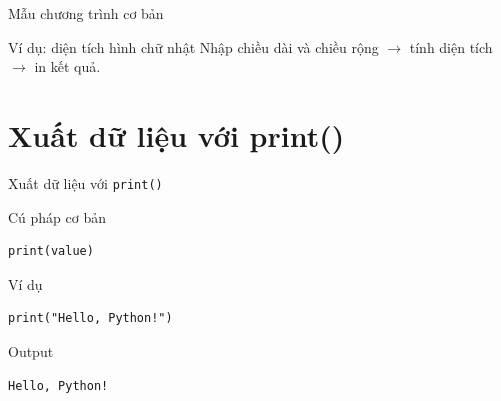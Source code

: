 \documentclass[aspectratio=169,10pt]{beamer}
\begin{document}
\begin{frame}{Mẫu chương trình cơ bản}
\begin{center}
\end{center}
\vspace{0.3cm}
\begin{block}{Ví dụ: diện tích hình chữ nhật}
Nhập chiều dài và chiều rộng $\rightarrow$ tính diện tích $\rightarrow$ in kết quả.
\end{block}
\end{frame}

\section{Xuất dữ liệu với print()}

\begin{frame}[fragile]{Xuất dữ liệu với \texttt{print()}}
\begin{block}{Cú pháp cơ bản}
\begin{lstlisting}
print(value)
\end{lstlisting}
\end{block}
\begin{exampleblock}{Ví dụ}
\begin{lstlisting}
print("Hello, Python!")
\end{lstlisting}
\end{exampleblock}
\begin{block}{Output}
\begin{verbatim}
Hello, Python!
\end{verbatim}
\end{block}
\end{frame}
\end{document}
